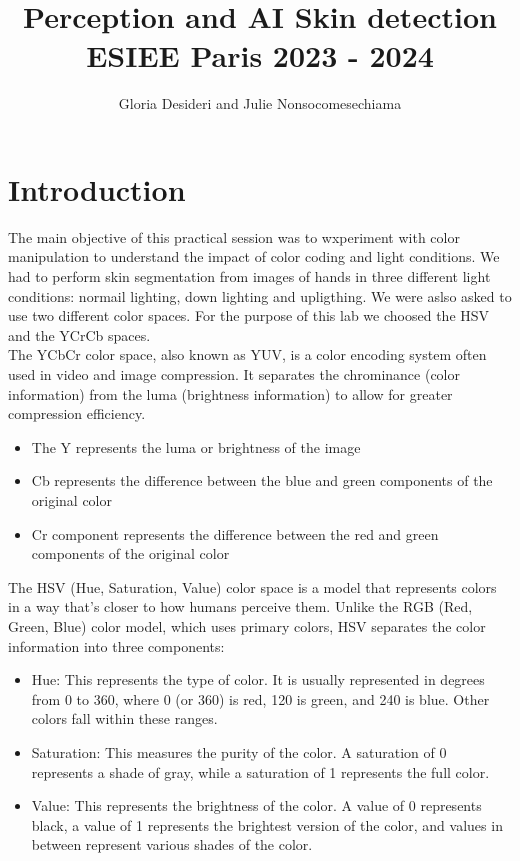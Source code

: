 \documentclass{report}
\title{\Huge{Perception and AI Skin detection}\\ ESIEE Paris 2023 - 2024}
\author{\huge{Gloria Desideri and Julie Nonsocomesechiama }}
\date{}
\begin{document}
\maketitle
\newpage%
\tableofcontents
\pagebreak

\chapter{Introduction}
The main objective of this practical session was to wxperiment with color manipulation
to understand the impact of color coding and light conditions. We had to perform
skin segmentation from images of hands in three different light conditions: normail lighting,
down lighting and upligthing. We were aslso asked to use two different color spaces. For 
the purpose of this lab we choosed the HSV and the YCrCb spaces.\\
The YCbCr color space, also known as YUV, is a color encoding system often used in video and image compression. It separates the chrominance (color information) from the luma (brightness information) to allow for greater compression efficiency.
\begin{itemize}
  \item The Y represents the luma or brightness of the image
  \item Cb represents the difference between the blue and green components of the original color
  \item Cr component represents the difference between the red and green components of the original color
\end{itemize}
The HSV (Hue, Saturation, Value) color space is a model that represents colors in a way that's closer to how humans perceive them. Unlike the RGB (Red, Green, Blue) color model, which uses primary colors, HSV separates the color information into three components:
\begin{itemize}
  \item Hue: This represents the type of color. It is usually represented in degrees from 0 to 360, where 0 (or 360) is red, 120 is green, and 240 is blue. Other colors fall within these ranges. 
  \item Saturation: This measures the purity of the color. A saturation of 0 represents a shade of gray, while a saturation of 1 represents the full color.
  \item Value: This represents the brightness of the color. A value of 0 represents black, a value of 1 represents the brightest version of the color, and values in between represent various shades of the color.
\end{itemize}
\end{document}
